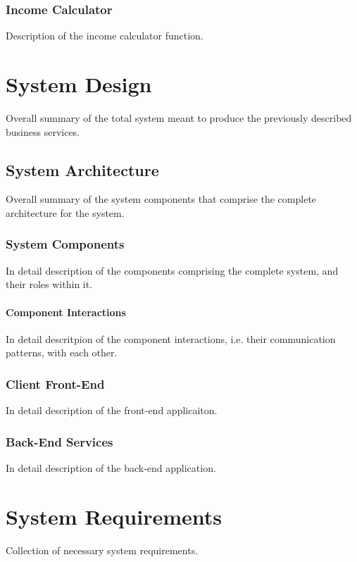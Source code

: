 \documentclass{report}
\begin{document}
\subsection{Income Calculator}
Description of the income calculator function.

\chapter{System Design}
Overall summary of the total system meant to produce the previously described business services.

\section{System Architecture}
Overall summary of the system components that comprise the complete architecture for the system.

\subsection{System Components}
In detail description of the components comprising the complete system, and their roles within it.

\subsubsection{Component Interactions}
In detail descritpion of the component interactions, i.e. their communication patterns, with each other.

\subsection{Client Front-End}
In detail description of the front-end applicaiton.

\subsection{Back-End Services}
In detail description of the back-end application.

\chapter{System Requirements}
Collection of necessary system requirements.
\end{document}

